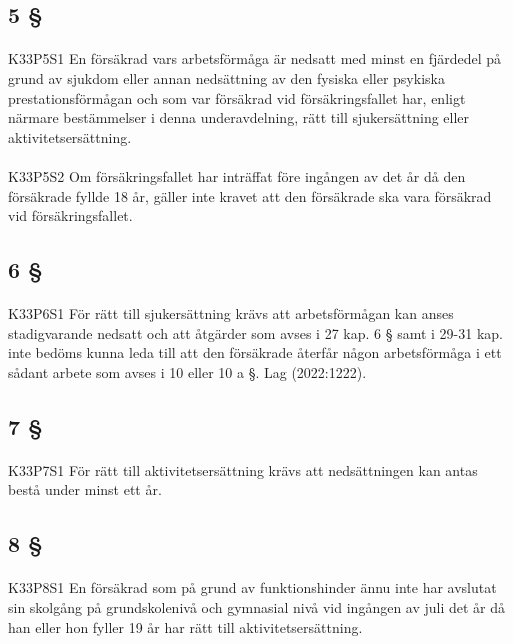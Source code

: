 \documentclass[a4paper,notitlepage,openany,10pt]{book}
\begin{document}
\subsection*{5 §}
\paragraph*{}
{\tiny K33P5S1}
En försäkrad vars arbetsförmåga är nedsatt med minst en fjärdedel på grund av sjukdom eller annan nedsättning av den fysiska eller psykiska prestationsförmågan och som var försäkrad vid försäkringsfallet har, enligt närmare bestämmelser i denna underavdelning, rätt till sjukersättning eller aktivitetsersättning.
\paragraph*{}
{\tiny K33P5S2}
Om försäkringsfallet har inträffat före ingången av det år då den försäkrade fyllde 18 år, gäller inte kravet att den försäkrade ska vara försäkrad vid försäkringsfallet.
\subsection*{6 §}
\paragraph*{}
{\tiny K33P6S1}
För rätt till sjukersättning krävs att arbetsförmågan kan anses stadigvarande nedsatt och att åtgärder som avses i 27 kap. 6 § samt i 29-31 kap. inte bedöms kunna leda till att den försäkrade återfår någon arbetsförmåga i ett sådant arbete som avses i 10 eller 10 a §.
Lag (2022:1222).
\subsection*{7 §}
\paragraph*{}
{\tiny K33P7S1}
För rätt till aktivitetsersättning krävs att nedsättningen kan antas bestå under minst ett år.
\subsection*{8 §}
\paragraph*{}
{\tiny K33P8S1}
En försäkrad som på grund av funktionshinder ännu inte har avslutat sin skolgång på grundskolenivå och gymnasial nivå vid ingången av juli det år då han eller hon fyller 19 år har rätt till aktivitetsersättning.
\end{document}

